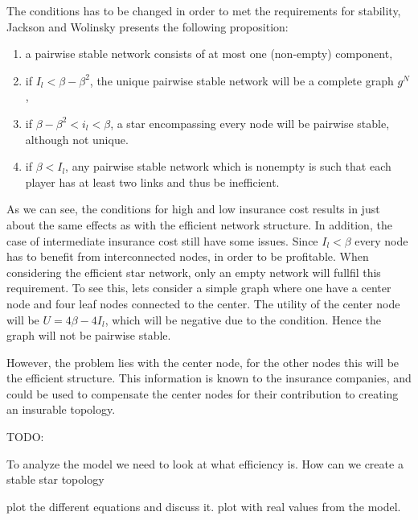 The conditions has to be changed in order to met the requirements for stability, Jackson and Wolinsky presents the following proposition:

\begin{enumerate}

\item a pairwise stable network consists of at most one (non-empty) component,
\item if $I_{l}<\beta - \beta^2$, the unique pairwise stable network will be a complete graph $g^N$, 
\item if $\beta - \beta^2 < i_{l} < \beta $, a star encompassing every node will be pairwise stable, although not unique.
\item if $\beta < I_{l}$, any pairwise stable network which is nonempty is such that each player has at least two links and thus be inefficient. 
\end{enumerate}

As we can see, the conditions for high and low insurance cost results in just about the same effects as with the efficient network structure. In addition, the case of intermediate insurance cost still have some issues. Since $I_{l} < \beta$ every node has to benefit from interconnected nodes, in order to be profitable. When considering the efficient star network, only an empty network will fullfil this requirement. To see this, lets consider a simple graph where one have a center node and four leaf nodes connected to the center. The utility of the center node will be $U = 4\beta - 4 I_{l}$, which will be negative due to the condition. Hence the graph will not be pairwise stable. 

However, the problem lies with the center node, for the other nodes this will be the efficient structure. This information is known to the insurance companies, and could be used to compensate the center nodes for their contribution to creating an insurable topology. 


TODO: 

To analyze the model we need to look at what efficiency is. 
How can we create a stable star topology

plot the different equations and discuss it. plot with real values from the model.


